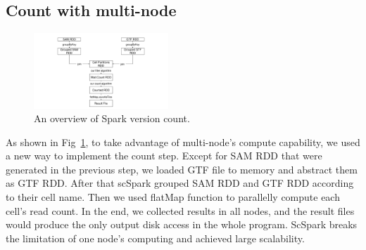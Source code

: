 \documentclass[conference]{IEEEtran}
\begin{document}
\subsection{Count with multi-node}
\begin{figure}
	\includegraphics[width=0.45\textwidth]{Fig3.pdf}
	\caption{An overview of Spark version count.} \label{fig3}
\end{figure}
As shown in Fig~\ref{fig3}, to take advantage of multi-node's compute capability, we used a new way to implement the count step. 
Except for SAM RDD that were generated in the previous step, we loaded GTF file to memory and abstract them as GTF RDD. 
After that scSpark grouped SAM RDD and GTF RDD according to their cell name. 
Then we used flatMap function to parallelly compute each cell's read count. 
In the end, we collected results in all nodes, and the result files would produce the only output disk access in the whole program. 
ScSpark breaks the limitation of one node's computing and achieved large scalability. 
\end{document}

